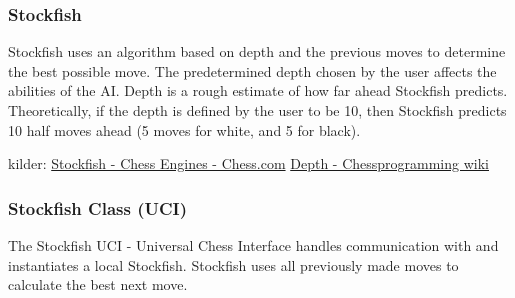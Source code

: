 \subsubsection{Stockfish}
Stockfish uses an algorithm based on depth and the previous moves to determine the best possible move. The predetermined depth chosen by the user affects the abilities of the AI. Depth is a rough estimate of how far ahead Stockfish predicts. Theoretically, if the depth is defined by the user to be 10, then Stockfish predicts 10 half moves ahead (5 moves for white, and 5 for black). 

kilder: 
\href{https://www.chess.com/terms/stockfish-chess-engine}{Stockfish - Chess Engines - Chess.com} 
\href{https://www.chessprogramming.org/Depth}{Depth - Chessprogramming wiki} 

\subsubsection{Stockfish Class (UCI)}
The Stockfish UCI - Universal Chess Interface handles communication with and instantiates a local Stockfish. Stockfish uses all previously made moves to calculate the best next move. 



